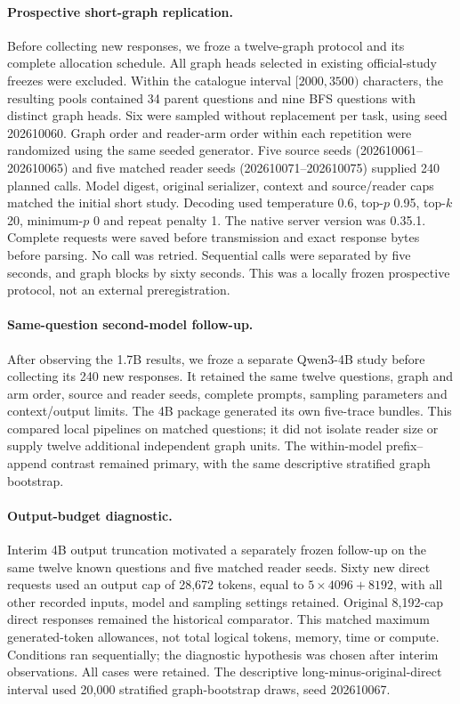 \paragraph{Prospective short-graph replication.} Before collecting new responses, we froze a twelve-graph protocol and its complete allocation schedule. All graph heads selected in existing official-study freezes were excluded. Within the catalogue interval $[2000,3500)$ characters, the resulting pools contained 34 parent questions and nine BFS questions with distinct graph heads. Six were sampled without replacement per task, using seed 202610060. Graph order and reader-arm order within each repetition were randomized using the same seeded generator. Five source seeds (202610061--202610065) and five matched reader seeds (202610071--202610075) supplied 240 planned calls. Model digest, original serializer, context and source/reader caps matched the initial short study. Decoding used temperature 0.6, top-$p$ 0.95, top-$k$ 20, minimum-$p$ 0 and repeat penalty 1. The native server version was 0.35.1. Complete requests were saved before transmission and exact response bytes before parsing. No call was retried. Sequential calls were separated by five seconds, and graph blocks by sixty seconds. This was a locally frozen prospective protocol, not an external preregistration.

\paragraph{Same-question second-model follow-up.} After observing the 1.7B results, we froze a separate Qwen3-4B study before collecting its 240 new responses. It retained the same twelve questions, graph and arm order, source and reader seeds, complete prompts, sampling parameters and context/output limits. The 4B package generated its own five-trace bundles. This compared local pipelines on matched questions; it did not isolate reader size or supply twelve additional independent graph units. The within-model prefix--append contrast remained primary, with the same descriptive stratified graph bootstrap.

\paragraph{Output-budget diagnostic.} Interim 4B output truncation motivated a separately frozen follow-up on the same twelve known questions and five matched reader seeds. Sixty new direct requests used an output cap of 28,672 tokens, equal to $5\times4096+8192$, with all other recorded inputs, model and sampling settings retained. Original 8,192-cap direct responses remained the historical comparator. This matched maximum generated-token allowances, not total logical tokens, memory, time or compute. Conditions ran sequentially; the diagnostic hypothesis was chosen after interim observations. All cases were retained. The descriptive long-minus-original-direct interval used 20,000 stratified graph-bootstrap draws, seed 202610067.

